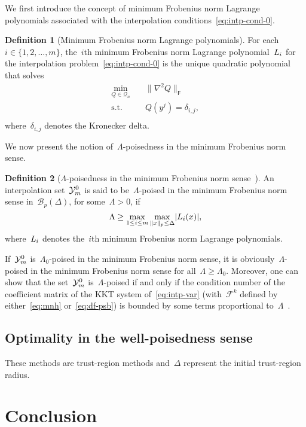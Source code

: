 \documentclass[draft]{article}
\numberwithin{equation}{section}
\theoremstyle{definition}
\newtheorem{definition}{Definition}[section]
\newcommand{\abs}[2][]{#1\lvert#2#1\rvert}
\newcommand{\lagp}[1][]{L\ifblank{#1}{}{_{#1}}}
\newcommand{\norm}[2][]{#1\lVert#2#1\rVert}
\newcommand{\qpoly}{\mathcal{Q}_n}
\newcommand{\set}[2][]{#1\{#2#1\}}
\newcommand{\xpt}[1][]{\mathcal{Y}\ifblank{#1}{}{^{#1}}}
\begin{document}
We first introduce the concept of minimum Frobenius norm Lagrange polynomials associated with the interpolation conditions~\eqref{eq:intp-cond-0}.

\begin{definition}[Minimum Frobenius norm Lagrange polynomials]
    For each~$i \in \set{1, 2, \dots, m}$, the~$i$th minimum Frobenius norm Lagrange polynomial~$\lagp[i]$ for the interpolation problem~\eqref{eq:intp-cond-0} is the unique quadratic polynomial that solves
    \begin{equation*}
        \begin{aligned}
            \min_{Q \in \qpoly} & \quad \norm{\nabla^2 Q}_{\mathsf{F}}\\
            \text{s.t.}         & \quad Q(y^j) = \delta_{i, j},\\
        \end{aligned}
    \end{equation*}
    where~$\delta_{i, j}$ denotes the Kronecker delta.
\end{definition}

We now present the notion of~$\Lambda$-poisedness in the minimum Frobenius norm sense.

\begin{definition}[$\Lambda$-poisedness in the minimum Frobenius norm sense~{\cite[Def.~5.6]{Conn_Scheinberg_Vicente_2009}}]
    An interpolation set~$\xpt[0]_m$ is said to be~$\Lambda$-poised in the minimum Frobenius norm sense in~$\mathcal{B}_p(\Delta)$, for some~$\Lambda > 0$, if
    \begin{equation*}
        \Lambda \ge \max_{1 \le i \le m} \max_{\norm{x}_p \le \Delta} \abs{\lagp[i](x)},
    \end{equation*}
    where~$\lagp[i]$ denotes the~$i$th minimum Frobenius norm Lagrange polynomials.
\end{definition}

If~$\xpt[0]_m$ is~$\Lambda_0$-poised in the minimum Frobenius norm sense, it is obviously~$\Lambda$-poised in the minimum Frobenius norm sense for all~$\Lambda \ge \Lambda_0$.
Moreover, one can show that the set~$\xpt[0]_m$ is~$\Lambda$-poised if and only if the condition number of the coefficient matrix of the KKT system of~\eqref{eq:intp-var} (with~$\mathcal{F}^k$ defined by either~\eqref{eq:mnh} or~\eqref{eq:df-psb}) is bounded by some terms proportional to~$\Lambda$~\cite[Thm.~5.8]{Conn_Scheinberg_Vicente_2009}.


\subsection{Optimality in the well-poisedness sense}

These methods are trust-region methods and~$\Delta$ represent the initial trust-region radius.

\section{Conclusion}




\listoffixmes
\end{document}
